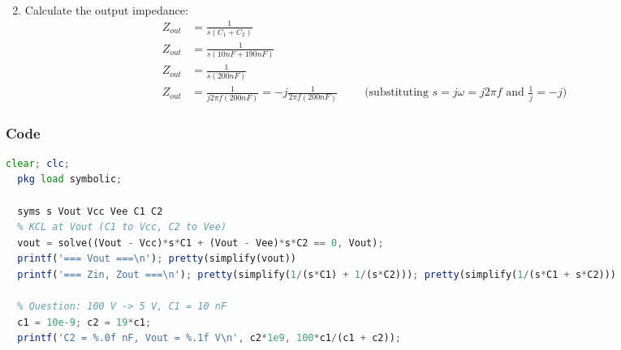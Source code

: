 \begin{enumerate}
\begin{align*}
    \end{align*}
  \item Calculate the output impedance:
    \begin{align*}
      Z_{out} &= \frac{1}{s(C_1 + C_2)} \\
      Z_{out} &= \frac{1}{s(10nF + 190nF)} \\
      Z_{out} &= \frac{1}{s(200nF)} \\
      Z_{out} &= \frac{1}{j 2 \pi f (200nF)} = -j \frac{1}{2 \pi f (200nF)} \hspace{1cm} \text{(substituting \(s = j \omega = j 2 \pi f\) and \(\frac{1}{j} = -j\))}
    \end{align*}
\end{enumerate}

\subsubsection{Code}
\begin{lstlisting}[language=Octave]
  clear; clc;
  pkg load symbolic;

  syms s Vout Vcc Vee C1 C2
  % KCL at Vout (C1 to Vcc, C2 to Vee)
  vout = solve((Vout - Vcc)*s*C1 + (Vout - Vee)*s*C2 == 0, Vout);
  printf('=== Vout ===\n'); pretty(simplify(vout))
  printf('=== Zin, Zout ===\n'); pretty(simplify(1/(s*C1) + 1/(s*C2))); pretty(simplify(1/(s*C1 + s*C2)))

  % Question: 100 V -> 5 V, C1 = 10 nF
  c1 = 10e-9; c2 = 19*c1;
  printf('C2 = %.0f nF, Vout = %.1f V\n', c2*1e9, 100*c1/(c1 + c2));
\end{lstlisting}
